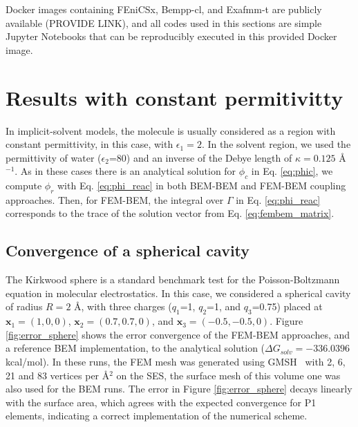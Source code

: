 Docker images containing FEniCSx, Bempp-cl, and Exafmm-t are publicly available (PROVIDE LINK), and all codes used in this sections are simple Jupyter Notebooks that can be reproducibly executed in this provided Docker image.

\section*{\sffamily \Large Results with constant permitivitty}

In implicit-solvent models, the molecule is usually considered as a region with constant permittivity, in this case, with $\epsilon_1=2$.
In the solvent region, we used the permittivity of water ($\epsilon_2$=80) and an inverse of the Debye length of $\kappa=0.125$ \AA$^{-1}$.
As in these cases there is an analytical solution for $\phi_c$ in Eq. \eqref{eq:phic}, we compute $\phi_r$ with Eq. \eqref{eq:phi_reac} in both BEM-BEM and FEM-BEM coupling approaches. Then, for FEM-BEM, the integral over $\Gamma$ in Eq. \eqref{eq:phi_reac} corresponds to the trace of the solution vector from Eq. \eqref{eq:fembem_matrix}.

\subsection*{\sffamily \large Convergence of a spherical cavity}

The Kirkwood sphere \cite{Kirkwood1934} is a standard benchmark test for the Poisson-Boltzmann equation in molecular electrostatics. 
In this case, we considered a spherical cavity of radius $R=2$ \AA, with three charges ($q_1$=1, $q_2$=1, and $q_3$=0.75) placed at $\mathbf{x}_1=(1,0,0)$, $\mathbf{x}_2=(0.7,0.7,0)$, and $\mathbf{x}_3=(-0.5,-0.5,0)$.
Figure \ref{fig:error_sphere} shows the error convergence of the FEM-BEM approaches, and a reference BEM implementation, to the analytical solution ($\Delta G_{solv}= -336.0396$ kcal/mol). 
In these runs, the FEM mesh was generated using GMSH~\cite{geuzaine2009gmsh} 
with %
2, 6, 21 and 83 vertices per \AA$^2$ on the SES, the surface mesh of this volume one was also used for the BEM runs. 
The error in Figure \ref{fig:error_sphere} decays linearly with the surface area, which agrees with the expected convergence for P1 elements, indicating a correct implementation of the numerical scheme. 

